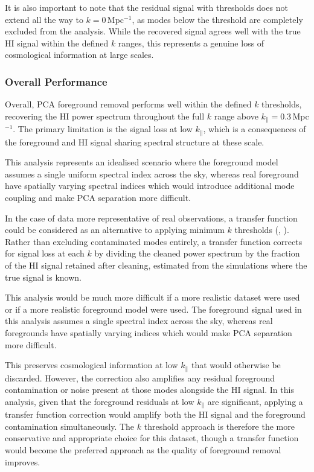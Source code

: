 It is also important to note that the residual signal with thresholds does not extend all the way to $k = 0$\,Mpc$^{-1}$, as modes below the threshold are completely excluded from the analysis. While the recovered signal agrees well with the true HI signal within the defined $k$ ranges, this represents a genuine loss of cosmological information at large scales.

\subsubsection{Overall Performance}

Overall, PCA foreground removal performs well within the defined $k$ thresholds, recovering the HI power spectrum throughout the full $k$ range above $k_{\parallel} = 0.3$\,Mpc$^{-1}$. The primary limitation is the signal loss at low $k_{\parallel}$, which is a consequences of the foreground and HI signal sharing spectral structure at these scale. 

This analysis represents an idealised scenario where the foreground model assumes a single uniform spectral index across the sky, whereas real foreground have spatially varying spectral indices which would introduce additional mode coupling and make PCA separation more difficult. 

In the case of data more representative of real observations, a transfer function could be considered as an alternative to applying minimum $k$ thresholds (\cite{masuiMEASUREMENT21Cm2013}, \cite{switzerINTERPRETINGUNRESOLVEDINTENSITY2015}). Rather than excluding contaminated modes entirely, a transfer function corrects for signal loss at each $k$ by dividing the cleaned power spectrum by the fraction of the HI signal retained after cleaning, estimated from the simulations where the true signal is known. 

This analysis would be much more difficult if a more realistic dataset were used or if a more realistic foreground model were used. The foreground signal used in this analysis assumes a single spectral index across the sky, whereas real foregrounds have spatially varying indices which would make PCA separation more difficult.

This preserves cosmological information at low $k_{\parallel}$ that would otherwise be discarded. However, the correction also amplifies any residual foreground contamination or noise present at those modes alongside the HI signal. In this analysis, given that the foreground residuals at low $k_{\parallel}$ are significant, applying a transfer function correction would amplify both the HI signal and the foreground contamination simultaneously. The $k$ threshold approach is therefore the more conservative and appropriate choice for this dataset, though a transfer function would become the preferred approach as the quality of foreground removal improves.

